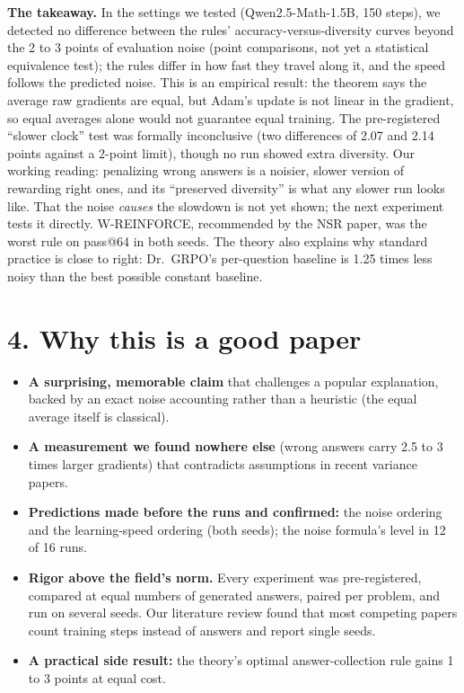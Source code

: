 \documentclass[11pt]{article}
\begin{document}
\textbf{The takeaway.} In the settings we tested (Qwen2.5-Math-1.5B, 150 steps), we detected no difference between the rules' accuracy-versus-diversity curves beyond the 2 to 3 points of evaluation noise (point comparisons, not yet a statistical equivalence test); the rules differ in how fast they travel along it, and the speed follows the predicted noise. This is an empirical result: the theorem says the average raw gradients are equal, but Adam's update is not linear in the gradient, so equal averages alone would not guarantee equal training. The pre-registered ``slower clock'' test was formally inconclusive (two differences of 2.07 and 2.14 points against a 2-point limit), though no run showed extra diversity. Our working reading: penalizing wrong answers is a noisier, slower version of rewarding right ones, and its ``preserved diversity'' is what any slower run looks like. That the noise \emph{causes} the slowdown is not yet shown; the next experiment tests it directly. W-REINFORCE, recommended by the NSR paper, was the worst rule on pass@64 in both seeds. The theory also explains why standard practice is close to right: Dr.\ GRPO's per-question baseline is 1.25 times less noisy than the best possible constant baseline.

\section*{4. Why this is a good paper}
\begin{itemize}[leftmargin=*,itemsep=1pt]
\item \textbf{A surprising, memorable claim} that challenges a popular explanation, backed by an exact noise accounting rather than a heuristic (the equal average itself is classical).
\item \textbf{A measurement we found nowhere else} (wrong answers carry 2.5 to 3 times larger gradients) that contradicts assumptions in recent variance papers.
\item \textbf{Predictions made before the runs and confirmed:} the noise ordering and the learning-speed ordering (both seeds); the noise formula's level in 12 of 16 runs.
\item \textbf{Rigor above the field's norm.} Every experiment was pre-registered, compared at equal numbers of generated answers, paired per problem, and run on several seeds. Our literature review found that most competing papers count training steps instead of answers and report single seeds.
\item \textbf{A practical side result:} the theory's optimal answer-collection rule gains 1 to 3 points at equal cost.
\end{itemize}
\end{document}
